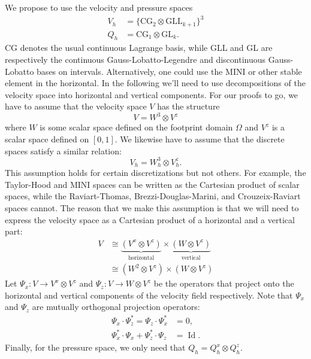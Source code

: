 \documentclass{article}
\theoremstyle{definition}
\theoremstyle{plain}
\newcommand{\Id}[1]{\operatorname{Id} #1}
\begin{document}
We propose to use the velocity and pressure spaces
\begin{align}
    V_h & = \{\text{CG}_2 \otimes \text{GLL}_{k + 1}\}^3 \\
    Q_h & = \text{CG}_1 \otimes \text{GL}_k.
\end{align}
CG denotes the usual continuous Lagrange basis, while GLL and GL are respectively the continuous Gauss-Lobatto-Legendre and discontinuous Gauss-Lobatto bases on intervals.
Alternatively, one could use the MINI or other stable element in the horizontal.
In the following we'll need to use decompositions of the velocity space into horizontal and vertical components.
For our proofs to go, we have to assume that the velocity space $V$ has the structure
\begin{equation}
    V = W^3 \otimes V^z
\end{equation}
where $W$ is some scalar space defined on the footprint domain $\Omega$ and $V^z$ is a scalar space defined on $[0, 1]$.
We likewise have to assume that the discrete spaces satisfy a similar relation:
\begin{equation}
    V_h = W_h^3 \otimes V_h^z.
\end{equation}
This assumption holds for certain discretizations but not others.
For example, the Taylor-Hood and MINI spaces can be written as the Cartesian product of scalar spaces, while the Raviart-Thomas, Brezzi-Douglas-Marini, and Crouzeix-Raviart spaces cannot.
The reason that we make this assumption is that we will need to express the velocity space as a Cartesian product of a horizontal and a vertical part:
\begin{align}
    V & \cong \underbrace{(V^x \otimes V^z)}_{\text{horizontal}} \times \underbrace{(W \otimes V^z)}_{\text{vertical}} \\
    & \cong (W^2\otimes V^z) \times (W \otimes V^z)
    \label{eq:space-decomposition}
\end{align}
Let $\Psi_x : V \to V^x\otimes V^z$ and $\Psi_z : V \to W \otimes V^z$ be the operators that project onto the horizontal and vertical components of the velocity field respectively.
Note that $\Psi_x$ and $\Psi_z$ are mutually orthogonal projection operators:
\begin{align}
    \Psi_x\cdot\Psi_z^* = \Psi_z\cdot\Psi_x^* & = 0, \label{eq:orthogonal-projection} \\
    \Psi_x^*\cdot\Psi_x + \Psi_z^*\cdot\Psi_z & = \Id.
\end{align}
Finally, for the pressure space, we only need that $Q_h = Q_h^x\otimes Q_h^z$.
\end{document}
